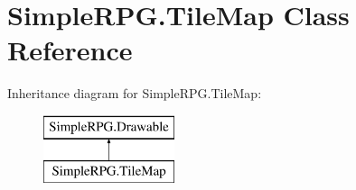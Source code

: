 \hypertarget{class_simple_r_p_g_1_1_tile_map}{\section{Simple\-R\-P\-G.\-Tile\-Map Class Reference}
\label{class_simple_r_p_g_1_1_tile_map}
}
Inheritance diagram for Simple\-R\-P\-G.\-Tile\-Map\-:\begin{figure}[H]
\begin{center}
\leavevmode
\includegraphics[height=2.000000cm]{class_simple_r_p_g_1_1_tile_map}
\end{center}
\end{figure}
